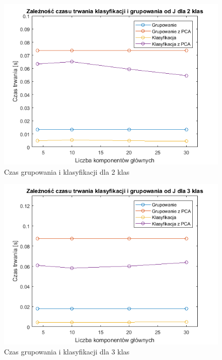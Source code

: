 \begin{figure}[H]
	\centering
	\includegraphics{img/time_from_J_2classes.png}
	\caption{Czas grupowania i klasyfikacji dla 2 klas}  
	\label{rys:time_from_J_2classes} 
\end{figure}

\begin{figure}[H]
	\centering
	\includegraphics{img/time_from_J_3classes.png}
	\caption{Czas grupowania i klasyfikacji dla 3 klas}  
	\label{rys:time_from_J_3classes} 
\end{figure}

